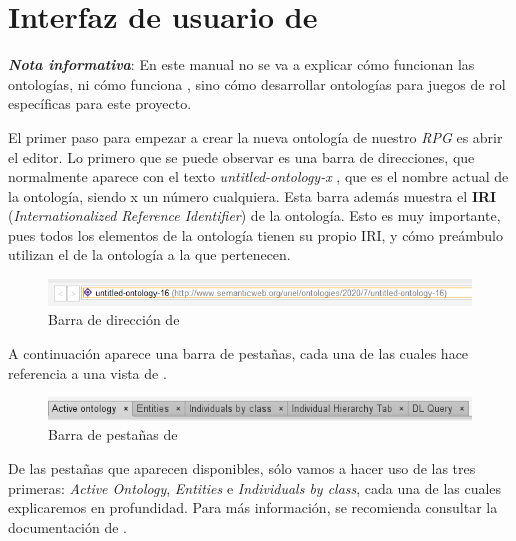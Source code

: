 
\section{Interfaz de usuario de \protege}
\textit{\textbf{Nota informativa}}: En este manual no se va a explicar cómo funcionan las ontologías, 
ni cómo funciona \protege, sino cómo desarrollar ontologías para juegos de rol específicas para este proyecto. \medskip

El primer paso para empezar a crear la nueva ontología de nuestro \textit{RPG} es abrir el editor.
Lo primero que se puede observar es una barra de direcciones, que normalmente aparece con el texto
\textit{untitled-ontology-x }, que es el nombre actual de la ontología, siendo x un número cualquiera. 
Esta barra además muestra el \textbf{IRI} (\textit{Internationalized Reference Identifier}) de la ontología. 
Esto es muy importante, pues todos los elementos de la ontología tienen 
su propio IRI, y cómo preámbulo utilizan el de la ontología a la que pertenecen. \medskip

\begin{figure}[H]
    \centering
    \includegraphics[scale=0.8]{Figures/Protege/IRI_bar.png}
    \caption{Barra de dirección de \protege}
    \label{IRI_bar}
\end{figure}

A continuación aparece una barra de pestañas, cada una de las cuales hace referencia a una vista 
de \protege. \medskip
\begin{figure}[H]
    \centering
    \includegraphics[scale=0.8]{Figures/Protege/Tab_bar.png}
    \caption{Barra de pestañas de \protege}
    \label{Tab_bar}
\end{figure}

De las pestañas que aparecen disponibles, sólo vamos a hacer uso de las tres primeras: \textit{Active Ontology}, 
\textit{Entities} e \textit{Individuals by class}, cada una de las cuales explicaremos en profundidad. Para más 
información, se recomienda consultar la documentación de \protege.

